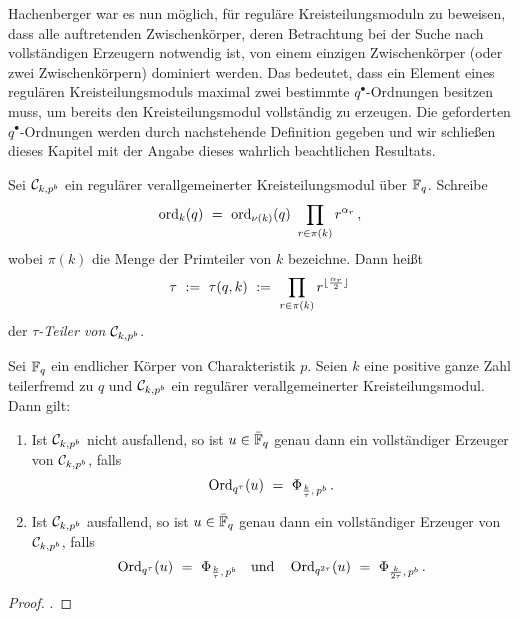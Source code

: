 Hachenberger war es nun möglich, für reguläre Kreisteilungsmoduln zu beweisen,
dass alle auftretenden Zwischenkörper, deren Betrachtung bei der Suche nach
vollständigen Erzeugern notwendig ist, von einem einzigen 
Zwischenkörper (oder zwei Zwischenkörpern) dominiert werden. Das bedeutet, dass
ein Element eines regulären Kreisteilungsmoduls maximal zwei bestimmte
$q^\bullet$-Ordnungen besitzen muss, um bereits den Kreisteilungsmodul
vollständig zu erzeugen. Die
geforderten $q^\bullet$-Ordnungen werden durch nachstehende Definition gegeben
und wir schließen dieses Kapitel mit der Angabe dieses wahrlich beachtlichen
Resultats.

\begin{definition}
  \label{def:tau}
  Sei $\mathcal{C}_{k,p^b}$ ein regulärer verallgemeinerter Kreisteilungsmodul über
  $\mathbb{F}_q$. Schreibe
  \[ \operatorname{ord}_k(q) \ =\  \operatorname{ord}_{\nu(k)}(q) \ \prod_{r \in \pi(k)} r^{\alpha_r}\,,\]
  wobei $\pi(k)$ die Menge der Primteiler von $k$ bezeichne.
  Dann heißt
  \[ \tau \ :=\  \tau(q,k) \ :=\  \prod_{r\in \pi(k)} 
    r^{\lfloor \frac{\alpha_r}{2}\rfloor}\]
  der \emph{$\tau$-Teiler von $\mathcal{C}_{k,p^b}$}.
\end{definition}

\begin{satz}
  \label{satz:regulare_erweiterungen}
  Sei $\mathbb{F}_q$ ein endlicher Körper von Charakteristik $p$. 
  Seien $k$ eine positive ganze Zahl teilerfremd zu $q$ und 
  $\mathcal{C}_{k,p^b}$ ein regulärer verallgemeinerter Kreisteilungsmodul. Dann gilt:
  \begin{enumerate}
    \item Ist $\mathcal{C}_{k,p^b}$ nicht ausfallend, so ist $u \in \bar {\mathbb{F}}_q$ genau dann
      ein vollständiger Erzeuger von $\mathcal{C}_{k,p^b}$, falls
      \[ \operatorname{Ord}_{q^\tau}(u) \ =\  \Phi_{\frac k \tau,\, p^b} \,.\]
    \item Ist $\mathcal{C}_{k,p^b}$ ausfallend, so ist $u\in \bar {\mathbb{F}}_q$ genau dann
      ein vollständiger Erzeuger von $\mathcal{C}_{k,p^b}$, falls
      \[ \operatorname{Ord}_{q^\tau}(u) \ =\  \Phi_{\frac k \tau,\, p^b} \quad
        \text{und}\quad 
        \operatorname{Ord}_{q^{2\tau}}(u) \ =\  \Phi_{\frac{k}{2\tau},\, p^b}\,.\]
  \end{enumerate}
\end{satz}
\begin{proof}
  \autocite[Theorem 20.3]{hachenberger1997finite}.
\end{proof}
